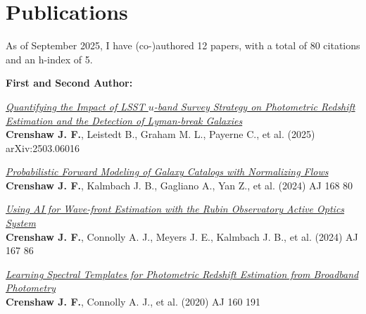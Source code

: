 \section{Publications}

As of September 2025, I have (co-)authored 12 papers, with a total of 80 citations and an h-index of 5. \vspace{2mm}

\textbf{First and Second Author:}
\begin{etaremune}
\item \href{https://ui.adsabs.harvard.edu/abs/2025arXiv250306016C}{\textit{Quantifying the Impact of LSST $u$-band Survey Strategy on Photometric Redshift Estimation and the Detection of Lyman-break Galaxies}} \\ 
\textbf{Crenshaw J. F.}, Leistedt B., Graham M. L., Payerne C., et al. (2025) 
arXiv:2503.06016 

\item \href{https://ui.adsabs.harvard.edu/abs/2024AJ....168...80C}{\textit{Probabilistic Forward Modeling of Galaxy Catalogs with Normalizing Flows}} \\ 
\textbf{Crenshaw J. F.}, Kalmbach J. B., Gagliano A., Yan Z., et al. (2024) 
AJ 168 80 

\item \href{https://ui.adsabs.harvard.edu/abs/2024AJ....167...86C}{\textit{Using AI for Wave-front Estimation with the Rubin Observatory Active Optics System}} \\ 
\textbf{Crenshaw J. F.}, Connolly A. J., Meyers J. E., Kalmbach J. B., et al. (2024) 
AJ 167 86 

\item \href{https://ui.adsabs.harvard.edu/abs/2020AJ....160..191C}{\textit{Learning Spectral Templates for Photometric Redshift Estimation from Broadband Photometry}} \\ 
\textbf{Crenshaw J. F.}, Connolly A. J., et al. (2020) 
AJ 160 191 

\end{etaremune}

